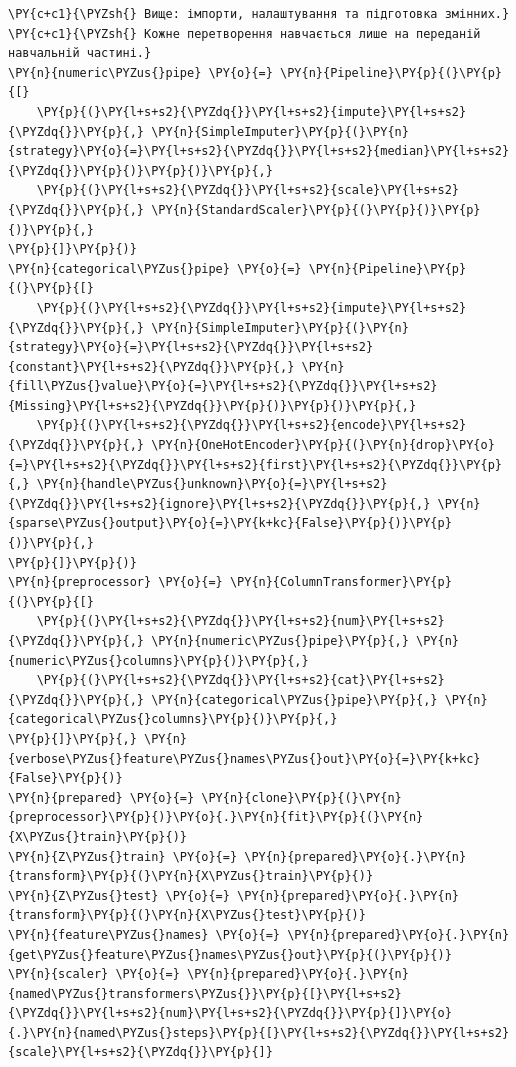 \begin{Verbatim}[commandchars=\\\{\}]
\PY{c+c1}{\PYZsh{} Вище: імпорти, налаштування та підготовка змінних.}
\PY{c+c1}{\PYZsh{} Кожне перетворення навчається лише на переданій навчальній частині.}
\PY{n}{numeric\PYZus{}pipe} \PY{o}{=} \PY{n}{Pipeline}\PY{p}{(}\PY{p}{[}
    \PY{p}{(}\PY{l+s+s2}{\PYZdq{}}\PY{l+s+s2}{impute}\PY{l+s+s2}{\PYZdq{}}\PY{p}{,} \PY{n}{SimpleImputer}\PY{p}{(}\PY{n}{strategy}\PY{o}{=}\PY{l+s+s2}{\PYZdq{}}\PY{l+s+s2}{median}\PY{l+s+s2}{\PYZdq{}}\PY{p}{)}\PY{p}{)}\PY{p}{,}
    \PY{p}{(}\PY{l+s+s2}{\PYZdq{}}\PY{l+s+s2}{scale}\PY{l+s+s2}{\PYZdq{}}\PY{p}{,} \PY{n}{StandardScaler}\PY{p}{(}\PY{p}{)}\PY{p}{)}\PY{p}{,}
\PY{p}{]}\PY{p}{)}
\PY{n}{categorical\PYZus{}pipe} \PY{o}{=} \PY{n}{Pipeline}\PY{p}{(}\PY{p}{[}
    \PY{p}{(}\PY{l+s+s2}{\PYZdq{}}\PY{l+s+s2}{impute}\PY{l+s+s2}{\PYZdq{}}\PY{p}{,} \PY{n}{SimpleImputer}\PY{p}{(}\PY{n}{strategy}\PY{o}{=}\PY{l+s+s2}{\PYZdq{}}\PY{l+s+s2}{constant}\PY{l+s+s2}{\PYZdq{}}\PY{p}{,} \PY{n}{fill\PYZus{}value}\PY{o}{=}\PY{l+s+s2}{\PYZdq{}}\PY{l+s+s2}{Missing}\PY{l+s+s2}{\PYZdq{}}\PY{p}{)}\PY{p}{)}\PY{p}{,}
    \PY{p}{(}\PY{l+s+s2}{\PYZdq{}}\PY{l+s+s2}{encode}\PY{l+s+s2}{\PYZdq{}}\PY{p}{,} \PY{n}{OneHotEncoder}\PY{p}{(}\PY{n}{drop}\PY{o}{=}\PY{l+s+s2}{\PYZdq{}}\PY{l+s+s2}{first}\PY{l+s+s2}{\PYZdq{}}\PY{p}{,} \PY{n}{handle\PYZus{}unknown}\PY{o}{=}\PY{l+s+s2}{\PYZdq{}}\PY{l+s+s2}{ignore}\PY{l+s+s2}{\PYZdq{}}\PY{p}{,} \PY{n}{sparse\PYZus{}output}\PY{o}{=}\PY{k+kc}{False}\PY{p}{)}\PY{p}{)}\PY{p}{,}
\PY{p}{]}\PY{p}{)}
\PY{n}{preprocessor} \PY{o}{=} \PY{n}{ColumnTransformer}\PY{p}{(}\PY{p}{[}
    \PY{p}{(}\PY{l+s+s2}{\PYZdq{}}\PY{l+s+s2}{num}\PY{l+s+s2}{\PYZdq{}}\PY{p}{,} \PY{n}{numeric\PYZus{}pipe}\PY{p}{,} \PY{n}{numeric\PYZus{}columns}\PY{p}{)}\PY{p}{,}
    \PY{p}{(}\PY{l+s+s2}{\PYZdq{}}\PY{l+s+s2}{cat}\PY{l+s+s2}{\PYZdq{}}\PY{p}{,} \PY{n}{categorical\PYZus{}pipe}\PY{p}{,} \PY{n}{categorical\PYZus{}columns}\PY{p}{)}\PY{p}{,}
\PY{p}{]}\PY{p}{,} \PY{n}{verbose\PYZus{}feature\PYZus{}names\PYZus{}out}\PY{o}{=}\PY{k+kc}{False}\PY{p}{)}
\PY{n}{prepared} \PY{o}{=} \PY{n}{clone}\PY{p}{(}\PY{n}{preprocessor}\PY{p}{)}\PY{o}{.}\PY{n}{fit}\PY{p}{(}\PY{n}{X\PYZus{}train}\PY{p}{)}
\PY{n}{Z\PYZus{}train} \PY{o}{=} \PY{n}{prepared}\PY{o}{.}\PY{n}{transform}\PY{p}{(}\PY{n}{X\PYZus{}train}\PY{p}{)}
\PY{n}{Z\PYZus{}test} \PY{o}{=} \PY{n}{prepared}\PY{o}{.}\PY{n}{transform}\PY{p}{(}\PY{n}{X\PYZus{}test}\PY{p}{)}
\PY{n}{feature\PYZus{}names} \PY{o}{=} \PY{n}{prepared}\PY{o}{.}\PY{n}{get\PYZus{}feature\PYZus{}names\PYZus{}out}\PY{p}{(}\PY{p}{)}
\PY{n}{scaler} \PY{o}{=} \PY{n}{prepared}\PY{o}{.}\PY{n}{named\PYZus{}transformers\PYZus{}}\PY{p}{[}\PY{l+s+s2}{\PYZdq{}}\PY{l+s+s2}{num}\PY{l+s+s2}{\PYZdq{}}\PY{p}{]}\PY{o}{.}\PY{n}{named\PYZus{}steps}\PY{p}{[}\PY{l+s+s2}{\PYZdq{}}\PY{l+s+s2}{scale}\PY{l+s+s2}{\PYZdq{}}\PY{p}{]}

\end{Verbatim}
